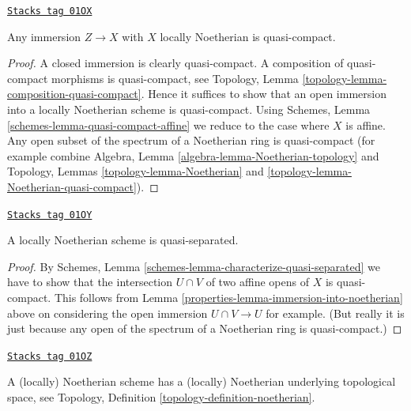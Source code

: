 \begin{lemma}
\label{properties-lemma-immersion-into-noetherian}
\href{https://stacks.math.columbia.edu/tag/01OX}{\texttt{Stacks tag 01OX}}

Any immersion $Z \to X$ with $X$ locally Noetherian is quasi-compact.
\end{lemma}

\begin{proof}
A closed immersion is clearly quasi-compact.
A composition of quasi-compact morphisms is quasi-compact,
see Topology, Lemma \ref{topology-lemma-composition-quasi-compact}.
Hence it suffices to show that an open immersion into
a locally Noetherian scheme is quasi-compact.
Using Schemes, Lemma \ref{schemes-lemma-quasi-compact-affine}
we reduce to the case where $X$ is affine.
Any open subset of the spectrum of a Noetherian ring
is quasi-compact (for example
combine Algebra, Lemma \ref{algebra-lemma-Noetherian-topology} and
Topology, Lemmas \ref{topology-lemma-Noetherian} and
\ref{topology-lemma-Noetherian-quasi-compact}).
\end{proof}

\begin{lemma}
\label{properties-lemma-locally-Noetherian-quasi-separated}
\href{https://stacks.math.columbia.edu/tag/01OY}{\texttt{Stacks tag 01OY}}

A locally Noetherian scheme is quasi-separated.
\end{lemma}

\begin{proof}

By Schemes, Lemma \ref{schemes-lemma-characterize-quasi-separated}
we have to show that the intersection $U \cap V$ of two
affine opens of $X$ is quasi-compact. This follows from
Lemma \ref{properties-lemma-immersion-into-noetherian} above on
considering the open immersion $U \cap V \to U$ for example.
(But really it is just because any open of the spectrum of a
Noetherian ring is quasi-compact.)
\end{proof}

\begin{lemma}
\label{properties-lemma-Noetherian-topology}
\href{https://stacks.math.columbia.edu/tag/01OZ}{\texttt{Stacks tag 01OZ}}

A (locally) Noetherian scheme has a (locally)
Noetherian underlying topological space,
see Topology, Definition \ref{topology-definition-noetherian}.
\end{lemma}

